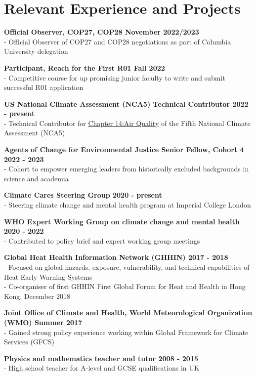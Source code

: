 \section*{Relevant Experience and Projects}

\noindent \textbf{Official Observer, COP27, COP28 \hfill November 2022/2023}\\
- Official Observer of COP27 and COP28 negotiations as part of Columbia University delegation\bigskip

\noindent \textbf{Participant, Reach for the First R01 \hfill Fall 2022}\\
- Competitive course for up promising junior faculty to write and submit successful R01 application \medskip

\noindent \textbf{US National Climate Assessment (NCA5) Technical Contributor \hfill 2022 - present}\\
- Technical Contributor for \href{https://nca2023.globalchange.gov/chapter/14/}{Chapter 14:Air Quality} of the Fifth National Climate Assessment (NCA5) \medskip

\noindent \textbf{Agents of Change for Environmental Justice Senior Fellow, Cohort 4 \hfill 2022 - 2023}\\
- Cohort to empower emerging leaders from historically excluded backgrounds in science and academia \medskip

\noindent \textbf{Climate Cares Steering Group \hfill 2020 - present}\\
- Steering climate change and mental health program at Imperial College London \medskip

\noindent \textbf{WHO Expert Working Group on climate change and mental health \hfill 2020 - 2022}\\
- Contributed to policy brief and expert working group meetings \medskip

\noindent \textbf{Global Heat Health Information Network (GHHIN) \hfill 2017 - 2018}\\
- Focused on global hazards, exposure, vulnerability, and technical capabilities of Heat Early Warning Systems\\
- Co-organiser of first GHHIN First Global Forum for Heat and Health in Hong Kong, December 2018 \medskip

\noindent \textbf{Joint Office of Climate and Health, World Meteorological Organization (WMO) \hfill Summer 2017}\\
\noindent - Gained strong policy experience working within Global Framework for Climate Services (GFCS) \medskip

\noindent \textbf{Physics and mathematics teacher and tutor \hfill 2008 - 2015}\\
- High school teacher for A-level and GCSE qualifications in UK

